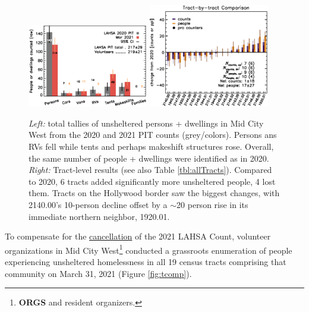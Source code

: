 \documentclass[11pt]{article}
\def\bfr{\bf\color{red}}
\begin{document}
\begin{figure}[h]
	\centering
	\includegraphics[width = 0.47\textwidth, trim = 1cm 0cm 0cm 1cm]{bars}
	\includegraphics[width = 0.47\textwidth, trim = 0cm 0cm 0cm 1cm]{tractsYrYr.eps}	
	\caption{{\it Left:} total tallies of unsheltered persons + dwellings in Mid City West from 
			the 2020 and 2021 PIT counts (grey/colors). Persons ans RVs fell while 
			tents and perhaps makeshift structures rose. Overall, the same number of 
			people + dwellings were identified as in 2020. {\it Right:} Tract-level
			results (see also Table \ref{tbl:allTracts}). Compared to 2020, 6 tracts 
			added significantly more unsheltered people,
			4 lost them. Tracts on the Hollywood border saw the biggest changes, 
			with 2140.00's 10-person decline offset by a $\sim$20 person rise in its
			immediate northern neighbor, 1920.01.}
	\label{fig:rawCounts}
\end{figure}


 To compensate for the 
\href{https://laist.com/latest/post/20201209/LAHSA-cancels-2021-homeless-count-los-angeles-covid-19}
{cancellation} of the 2021 LAHSA Count, volunteer organizations in Mid City 
West\footnote{{\bfr ORGS} and resident organizers.} conducted a grassroots enumeration of 
people experiencing unsheltered homelessness 
in all 19 census tracts comprising that community on March 31, 2021 (Figure \ref{fig:tcomp}).\\
\end{document}
